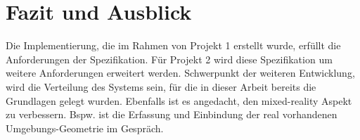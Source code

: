 \section{Fazit und Ausblick}

Die Implementierung, die im Rahmen von Projekt 1 erstellt wurde, erfüllt die Anforderungen der Spezifikation. Für Projekt 2 wird diese Spezifikation um weitere Anforderungen erweitert werden. Schwerpunkt der weiteren Entwicklung, wird die Verteilung des Systems sein, für die in dieser Arbeit bereits die Grundlagen gelegt wurden. Ebenfalls ist es angedacht, den mixed-reality Aspekt zu verbessern. Bspw. ist die Erfassung und Einbindung der real vorhandenen Umgebungs-Geometrie im Gespräch. 
